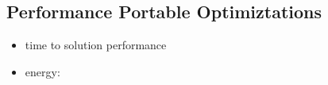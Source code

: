 \subsection{Performance Portable Optimiztations}

\begin{itemize}
    \item time to solution performance
    \item energy: %
\end{itemize}
